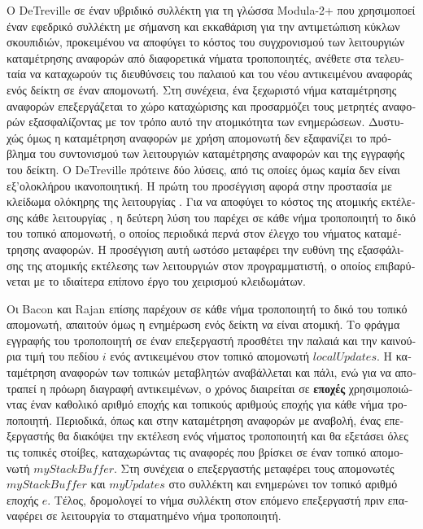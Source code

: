 \begin{greek}
Ο DeTreville \cite{detreville1990experience} σε έναν υβριδικό
συλλέκτη για τη γλώσσα Modula-2+ που χρησιμοποεί έναν
εφεδρικό συλλέκτη με σήμανση και εκκαθάριση για την
αντιμετώπιση κύκλων σκουπιδιών, προκειμένου να αποφύγει το
κόστος του συγχρονισμού των λειτουργιών καταμέτρησης αναφορών
από διαφορετικά νήματα τροποποιητές, ανέθετε στα τελευταία
να καταχωρούν τις διευθύνσεις του παλαιού και του νέου
αντικειμένου αναφοράς ενός δείκτη σε έναν απομονωτή. Στη
συνέχεια, ένα ξεχωριστό νήμα καταμέτρησης αναφορών επεξεργάζεται
το χώρο καταχώρισης και προσαρμόζει τους μετρητές αναφορών
εξασφαλίζοντας με τον τρόπο αυτό την ατομικότητα των ενημερώσεων.
Δυστυχώς όμως η καταμέτρηση αναφορών με χρήση απομονωτή δεν
εξαφανίζει το πρόβλημα του συντονισμού των λειτουργιών
καταμέτρησης αναφορών και της εγγραφής του δείκτη. Ο
DeTreville πρότεινε δύο λύσεις, από τις οποίες όμως καμία δεν
είναι εξ'ολοκλήρου ικανοποιητική. Η πρώτη του προσέγγιση αφορά
στην προστασία με κλείδωμα ολόκηρης της λειτουργίας
. Για να αποφύγει το κόστος της ατομικής
εκτέλεσης κάθε λειτουργίας , η δεύτερη λύση
του παρέχει σε κάθε νήμα τροποποιητή το δικό του τοπικό
απομονωτή, ο οποίος περιοδικά περνά στον έλεγχο του νήματος
καταμέτρησης αναφορών. Η προσέγγιση αυτή ωστόσο μεταφέρει
την ευθύνη της εξασφάλισης της ατομικής εκτέλεσης των
λειτουργιών  στον προγραμματιστή, ο οποίος
επιβαρύνεται με το ιδιαίτερα επίπονο έργο του χειρισμού
κλειδωμάτων.

Οι Bacon και Rajan \cite{DBLP:conf/ecoop/BaconR01} επίσης
παρέχουν σε κάθε νήμα τροποποιητή το δικό του τοπικό
απομονωτή, απαιτούν όμως η ενημέρωση ενός δείκτη να είναι
ατομική. Το φράγμα εγγραφής του τροποποιητή σε έναν επεξεργαστή
προσθέτει την παλαιά και την καινούρια τιμή του πεδίου $i$ ενός
αντικειμένου στον τοπικό απομονωτή $localUpdates$. Η καταμέτρηση
αναφορών των τοπικών μεταβλητών αναβάλλεται και πάλι, ενώ για
να αποτραπεί η πρόωρη διαγραφή αντικειμένων, ο χρόνος διαιρείται
σε \textbf{εποχές} χρησιμοποιώντας έναν καθολικό αριθμό εποχής
και τοπικούς αριθμούς εποχής για κάθε νήμα τροποποιητή.
Περιοδικά, όπως και στην καταμέτρηση αναφορών με αναβολή,
ένας επεξεργαστής θα διακόψει την εκτέλεση ενός νήματος
τροποποιητή και θα εξετάσει όλες τις τοπικές στοίβες,
καταχωρώντας τις αναφορές που βρίσκει σε έναν τοπικό απομονωτή
$myStackBuffer$. Στη συνέχεια ο επεξεργαστής μεταφέρει τους
απομονωτές $myStackBuffer$ και $myUpdates$ στο συλλέκτη και
ενημερώνει τον τοπικό αριθμό εποχής $e$. Τέλος, δρομολογεί
το νήμα συλλέκτη στον επόμενο επεξεργαστή πριν επαναφέρει
σε λειτουργία το σταματημένο νήμα τροποποιητή.


\end{greek}
